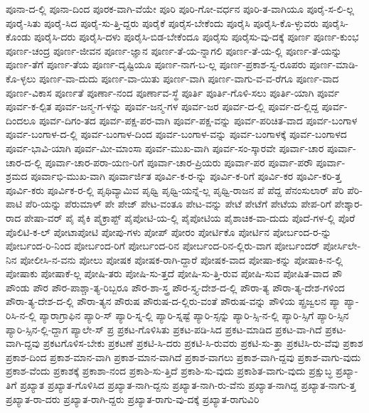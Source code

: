 {ಪೂನಾ-ದ-ಲ್ಲಿ
ಪೂನಾ-ದಿಂದ
ಪೂರಕ-ವಾಗಿ-ವೆಯೇ
ಪೂರಿ
ಪೂರಿ-ಗೋ-ವರ್ಧನ
ಪೂರಿ-ತ-ವಾಗಿಯೂ
ಪೂರೈ-ಸ-ಲಿ-ಲ್ಲ
ಪೂರೈ-ಸಿತು
ಪೂರೈ-ಸಿದ
ಪೂರೈ-ಸು-ತ್ತಿ-ದ್ದರು
ಪೂರೈಕೆ
ಪೂರೈಸ-ಬೇಕೆಂದು
ಪೂರೈಸಿ
ಪೂರೈಸಿ-ಕೊ-ಳ್ಳುವರು
ಪೂರೈಸಿ-ಕೊಂಡು
ಪೂರೈಸಿ-ದರು
ಪೂರೈಸಿ-ದಳು
ಪೂರೈಸಿ-ಬಿಡ-ಬೇಕೆಂದೂ
ಪೂರೈಸು
ಪೂರೈಸು-ವು-ದಕ್ಕೆ
ಪೂರ್ಣ
ಪೂರ್ಣ-ಕುಂಭ
ಪೂರ್ಣ-ಚಂದ್ರ
ಪೂರ್ಣ-ಜೀವನ
ಪೂರ್ಣ-ಜ್ಞಾನ
ಪೂರ್ಣ-ತೆ-ಯ-ನ್ನಾಗಲಿ
ಪೂರ್ಣ-ತೆ-ಯ-ಲ್ಲಿ
ಪೂರ್ಣ-ತೆ-ಯನ್ನು
ಪೂರ್ಣ-ತೆಗೆ
ಪೂರ್ಣ-ತೆಯ
ಪೂರ್ಣ-ದೃಷ್ಟಿಯೂ
ಪೂರ್ಣ-ನಾಗ-ಬ-ಲ್ಲ
ಪೂರ್ಣ-ಪ್ರಕಾಶ-ಸ್ವ-ರೂಪರು
ಪೂರ್ಣ-ಮಾಡಿ-ಕೊ-ಳ್ಳಲು
ಪೂರ್ಣ-ವಾ-ದುದು
ಪೂರ್ಣ-ವಾ-ಯಿತು
ಪೂರ್ಣ-ವಾಗಿ
ಪೂರ್ಣ-ವಾಗು-ವ-ವ-ರೆಗೂ
ಪೂರ್ಣ-ವಾದ
ಪೂರ್ಣ-ವಿಕಾಸ
ಪೂರ್ಣತೆ
ಪೂರ್ಣಾ-ನಂದ
ಪೂರ್ಣಾವ-ಸ್ಥೆ
ಪೂರ್ತಿ
ಪೂರ್ತಿ-ಗೊಳಿ-ಸಲು
ಪೂರ್ತಿ-ಯಾಗಿ
ಪೂರ್ವ
ಪೂರ್ವ-ಕ-ಲ್ಪಿತ
ಪೂರ್ವ-ಜನ್ಮ-ಗ-ಳನ್ನು
ಪೂರ್ವ-ಜನ್ಮ-ಗಳ
ಪೂರ್ವ-ಜರ
ಪೂರ್ವ-ದ-ಲ್ಲಿ
ಪೂರ್ವ-ದ-ಲ್ಲಿದ್ದ
ಪೂರ್ವ-ದಿಂದಲೂ
ಪೂರ್ವ-ದಿಗಂ-ತದ
ಪೂರ್ವ-ಪಕ್ಷ-ಪರ-ವಾಗಿ
ಪೂರ್ವ-ಪಕ್ಷ-ವನ್ನು
ಪೂರ್ವ-ಪರಿಚಿತ-ವಾದ
ಪೂರ್ವ-ಬಂಗಾಳ
ಪೂರ್ವ-ಬಂಗಾಳ-ದ-ಲ್ಲಿ
ಪೂರ್ವ-ಬಂಗಾಳ-ದಿಂದ
ಪೂರ್ವ-ಬಂಗಾಳ-ವನ್ನು
ಪೂರ್ವ-ಬಂಗಾಳಕ್ಕೆ
ಪೂರ್ವ-ಬಂಗಾಳದ
ಪೂರ್ವ-ಭಾವಿ-ಯಾಗಿ
ಪೂರ್ವ-ಮೀ-ಮಾಂಸಾ
ಪೂರ್ವ-ಮುಖ-ವಾಗಿ
ಪೂರ್ವ-ಸಂ-ಸ್ಕಾರವೇ
ಪೂರ್ವಾ-ಚಾರ
ಪೂರ್ವಾ-ಚಾರ-ದ-ಲ್ಲಿ
ಪೂರ್ವಾ-ಚಾರ-ಪರಾ-ಯಣ-ರಿಗೆ
ಪೂರ್ವಾ-ಚಾರ-ಪ್ರಿಯರು
ಪೂರ್ವಾ-ಪರ
ಪೂರ್ವಾ-ಪರೌ
ಪೂರ್ವಾ-ಶ್ರಮದ
ಪೂರ್ವಾಭಿ-ಮುಖ-ವಾಗಿ
ಪೂರ್ವಾರ್ಜಿತ
ಪೂರ್ವಿ-ಕ-ರ-ನ್ನು
ಪೂರ್ವಿ-ಕ-ರಿಗೆ
ಪೂರ್ವಿ-ಕರ
ಪೂರ್ವಿ-ಕರಿ-ತ್ತ
ಪೂರ್ವಿ-ಕರು
ಪೂರ್ವಿಕ-ರ-ಲ್ಲಿ
ಪೃಥಿವ್ಯಾಮಿವ
ಪೃಥ್ವಿ
ಪೃಥ್ವಿ-ಯನ್ನೆ-ಲ್ಲ
ಪೃಥ್ವಿ-ರಾಜನ
ಪೆ
ಪೆದ್ದ
ಪೆನಂಸುಲಾರ್
ಪೆರಿ
ಪೆರಿ-ಪಾಟಿ
ಪೆರಿ-ಯನ್ನು
ಪೆರುಮಾಳ್
ಪೇ
ಪೇಜ್
ಪೇಟ-ವಂತೂ
ಪೇಟ-ವನ್ನು
ಪೇಟೆ
ಪೇಟೆಗೆ
ಪೇಟೆಯ
ಪೇಪ-ರಿಗೆ
ಪೇಶ್ಕಾರ-ರಾದ
ಪೇಷಾ-ವರ್
ಪೈ
ಪೈಕಿ
ಪೈಕ್ರಾಪ್ಟ್
ಪೈಪೋಟಿ-ಯ-ಲ್ಲಿ
ಪೈಪೋಟಿಯ
ಪೈಶಾಚಿಕ-ವಾ-ದುದು
ಪೊದೆ-ಗಳ-ಲ್ಲಿ
ಪೊರೆ
ಪೊಲಿಟಿ-ಕ-ಲ್
ಪೋಟಾಪೋಟಿ
ಪೋಪು-ಗಳು
ಪೋಪ್
ಪೋರಂ
ಪೋರ್ಟಿಕೊ
ಪೋರ್ಟಿನ
ಪೋರ್ಬಂದ-ರ-ನ್ನು
ಪೋರ್ಬಂದ-ರಿ-ನಿಂದ
ಪೋರ್ಬಂದ-ರಿಗೆ
ಪೋರ್ಬಂದ-ರಿನ
ಪೋರ್ಬಂದ-ರಿನ-ಲ್ಲಿರು-ವಾಗ
ಪೋರ್ಬಂದರ್
ಪೋರ್ಸಿಲೇ-ನಿನ
ಪೋಲೀಸಿ-ನ-ವನು
ಪೋಲು
ಪೋಷಕ
ಪೋಷಕ-ರಾಗಿ-ದ್ದಾರೆ
ಪೋಷಕ-ವಾದ
ಪೋಷಾ-ಕನ್ನು
ಪೋಷಾಕಿ-ನ-ಲ್ಲಿ
ಪೋಷಾಕು
ಪೋಷಾಕೆ-ಲ್ಲ
ಪೋಷಿ-ತರು
ಪೋಷಿ-ಸು-ತ್ತದೆ
ಪೋಷಿ-ಸು-ತ್ತಿ-ರುವ
ಪೋಷಿ-ಸುವ
ಪೋಷಿತ-ವಾದ
ಪೌ
ಪೌಂಡು
ಪೌರ
ಪೌರ-ಪಾಶ್ಚಾ-ತ್ಯ-ರಿಬ್ಬರೂ
ಪೌರ-ಶಾ-ಸ್ತ್ರ
ಪೌರ-ಸ್ತ್ಯ-ದೇಶ-ದ-ಲ್ಲಿ
ಪೌರಾ-ತ್ಯ
ಪೌರಾ-ತ್ಯ-ದೇಶ-ಗಳಿಂದ
ಪೌರಾ-ತ್ಯ-ದೇಶ-ದ-ಲ್ಲಿ
ಪೌರಾ-ತ್ಯನ
ಪೌರುಷ
ಪೌರುಷ-ದ-ಲ್ಲಿರು-ವಂತೆ
ಪೌರುಷ-ವನ್ನು
ಪೌಳಿಯ
ಪ್ಪ್ರಜ್ವಲನ
ಪ್ಯಾ
ಪ್ಯಾ-ರಿಸಿ-ನ-ಲ್ಲಿ
ಪ್ಯಾರಾಗ್ರಾಫಿನ
ಪ್ಯಾರಿ-ಸ್
ಪ್ಯಾರಿ-ಸ್ನ-ಲ್ಲಿ
ಪ್ಯಾರಿ-ಸ್ನಷ್ಟೆ
ಪ್ಯಾರಿ-ಸ್ಸನ್ನು
ಪ್ಯಾರಿ-ಸ್ಸಿ-ನ-ಲ್ಲಿ
ಪ್ಯಾರಿ-ಸ್ಸಿಗೆ
ಪ್ಯಾರಿ-ಸ್ಸಿನ
ಪ್ಯಾರಿ-ಸ್ಸಿನ-ಲ್ಲಿ-ದ್ದಾಗ
ಪ್ಯಾಲೇ-ಸ್
ಪ್ರ
ಪ್ರಕಟ-ಗೊಳಿಸಿತು
ಪ್ರಕಟ-ಪಡಿ-ಸಿದ
ಪ್ರಕಟ-ಮಾಡಿದ
ಪ್ರಕಟ-ವಾ-ಗಿದೆ
ಪ್ರಕಟ-ವಾಗಿ-ದ್ದವು
ಪ್ರಕಟಗೊಳಿಸ-ಬೇಕು
ಪ್ರಕಟಣೆ
ಪ್ರಕಟಿ-ಸಿ-ದರು
ಪ್ರಕಟಿ-ಸಿ-ರುವರು
ಪ್ರಕಟಿ-ಸು-ತ್ತಾ
ಪ್ರಕಟಿಸಿ-ರು-ವೆವು
ಪ್ರಕಾಶ
ಪ್ರಕಾಶ-ದಿಂದ
ಪ್ರಕಾಶ-ಮಾನ-ವಾಗಿ
ಪ್ರಕಾಶ-ಮಾನ-ವಾಗಿದೆ
ಪ್ರಕಾಶ-ವಾಗಲು
ಪ್ರಕಾಶ-ವಾಗಿ-ದ್ದವು
ಪ್ರಕಾಶ-ವಾಗು-ವುದು
ಪ್ರಕಾಶ-ವೆಂದು
ಪ್ರಕಾಶಕ್ಕೆ
ಪ್ರಕಾಶಾ-ನಂದ
ಪ್ರಕಾಶಿ-ಸು-ತ್ತಿದೆ
ಪ್ರಕಾಶಿ-ಸು-ವುದು
ಪ್ರಕಾಶಿತ-ವಾಗು-ವುದು
ಪ್ರಕ್ಷುಬ್ಧ
ಪ್ರಖ್ಯಾ-ತಿಗೆ
ಪ್ರಖ್ಯಾತ
ಪ್ರಖ್ಯಾತ-ಗೊಳಿಸಿದ
ಪ್ರಖ್ಯಾತ-ನಾಗಿ-ದ್ದನು
ಪ್ರಖ್ಯಾತ-ನಾಗಿ-ರು-ವೆನು
ಪ್ರಖ್ಯಾತ-ನಾಗಿದ್ದ
ಪ್ರಖ್ಯಾತ-ನಾಗು-ತ್ತ
ಪ್ರಖ್ಯಾತ-ರಾ-ದರು
ಪ್ರಖ್ಯಾತ-ರಾಗಿ-ದ್ದರು
ಪ್ರಖ್ಯಾತ-ರಾಗು-ವು-ದಕ್ಕೆ
ಪ್ರಖ್ಯಾತ-ರಾಗುವಿರಿ
}
